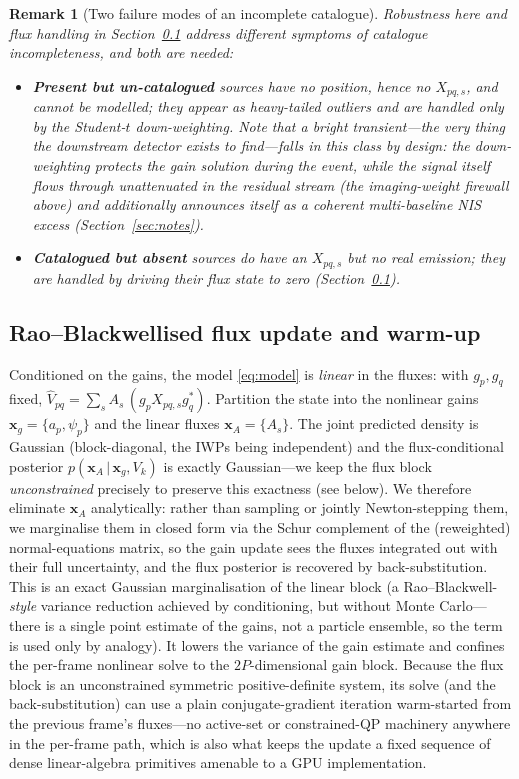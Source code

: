 \documentclass[11pt]{article}
\newtheorem{remark}{Remark}
\newcommand{\given}{\,|\,}
\begin{document}
\begin{remark}[Two failure modes of an incomplete catalogue]
Robustness here and flux handling in Section~\ref{sec:flux} address \emph{different} symptoms of
catalogue incompleteness, and both are needed:
\begin{itemize}[leftmargin=*]
  \item \textbf{Present but un-catalogued} sources have no position, hence no $X_{pq,s}$, and cannot
        be modelled; they appear as heavy-tailed outliers and are handled \emph{only} by the
        Student-$t$ down-weighting. Note that a bright transient---the very thing the downstream
        detector exists to find---falls in this class \emph{by design}: the down-weighting protects
        the gain solution during the event, while the signal itself flows through unattenuated in
        the residual stream (the imaging-weight firewall above) and additionally announces itself
        as a coherent multi-baseline NIS excess (Section~\ref{sec:notes}).
  \item \textbf{Catalogued but absent} sources do have an $X_{pq,s}$ but no real emission; they are
        handled by driving their flux state to zero (Section~\ref{sec:flux}).
\end{itemize}
\end{remark}

\subsection{Rao--Blackwellised flux update and warm-up}
\label{sec:flux}

Conditioned on the gains, the model \eqref{eq:model} is \emph{linear} in the fluxes: with $g_p,g_q$
fixed, $\hat V_{pq}=\sum_s A_s\,(g_p X_{pq,s} g_q^{\ast})$. Partition the state into the nonlinear
gains $\bm{x}_g=\{a_p,\psi_p\}$ and the linear fluxes $\bm{x}_A=\{A_s\}$. The joint predicted density
is Gaussian (block-diagonal, the IWPs being independent) and the flux-conditional posterior
$p(\bm{x}_A\given\bm{x}_g,V_k)$ is exactly Gaussian---we keep the flux block \emph{unconstrained}
precisely to preserve this exactness (see below). We therefore eliminate $\bm{x}_A$ analytically: rather than sampling or jointly
Newton-stepping them, we marginalise them in closed form via the Schur complement of the
(reweighted) normal-equations matrix, so the gain update sees the fluxes integrated out with their
full uncertainty, and the flux posterior is recovered by back-substitution. This is an exact
Gaussian marginalisation of the linear block (a Rao--Blackwell-\emph{style} variance reduction
achieved by conditioning, but without Monte Carlo---there is a single point estimate of the gains,
not a particle ensemble, so the term is used only by analogy). It lowers the variance of the gain
estimate and confines the per-frame nonlinear solve to the $2P$-dimensional gain block. Because the
flux block is an unconstrained symmetric positive-definite system, its solve (and the
back-substitution) can use a plain conjugate-gradient iteration warm-started from the previous
frame's fluxes---no active-set or constrained-QP machinery anywhere in the per-frame path, which is
also what keeps the update a fixed sequence of dense linear-algebra primitives amenable to a GPU
implementation.
\end{document}
